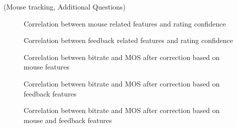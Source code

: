(Mouse tracking, Additional Questions) 


\begin{figure}[h]
	\centering
	\caption{Correlation between mouse related features and rating confidence}
	\label{fig:result:correlation_mouse_features_outlierness}
\end{figure}


\begin{figure}[h]
\centering
\caption{Correlation between feedback related features and rating confidence}
\label{fig:result:correlation_feedback_features_confidence}
\end{figure}


\begin{figure}[h]
\centering
\caption{Correlation between bitrate and MOS after correction based on mouse features}
\label{fig:result:correlation_bitrate_mos_after_mouse_correction}
\end{figure}


\begin{figure}[h]
\centering
\caption{Correlation between bitrate and MOS after correction based on feedback features}
\label{fig:result:correlation_bitrate_mos_after_feedback_correction}
\end{figure}


\begin{figure}[h]
\centering
\caption{Correlation between bitrate and MOS after correction based on mouse and feedback features}
\label{fig:result:correlation_bitrate_mos_after_both_correction}
\end{figure}
